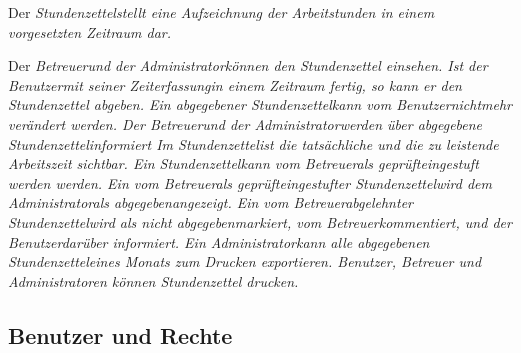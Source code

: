 \begin{requirements}
    Der \em Stundenzettel\em stellt eine Aufzeichnung der Arbeitstunden in einem vorgesetzten Zeitraum dar.
    \begin{requirements}
         Der \em Betreuer\em und der \em Administrator\em können den Stundenzettel einsehen.
         Ist der \em Benutzer\em mit seiner \em Zeiterfassung\em in einem Zeitraum fertig, so kann er den \em Stundenzettel abgeben\em.
         Ein \em abgegebener Stundenzettel\em kann vom \em Benutzer\em nichtmehr verändert werden.
         Der \em Betreuer\em und der \em Administrator\em werden über \em abgegebene Stundenzettel\em informiert
         Im \em Stundenzettel\em ist die tatsächliche und die zu leistende Arbeitszeit sichtbar.
         Ein \em Stundenzettel\em kann vom \em Betreuer\em als \em geprüft\em eingestuft werden werden.
         Ein vom \em Betreuer\em als \em geprüft\em eingestufter \em Stundenzettel\em wird dem \em Administrator\em als \em abgegeben\em angezeigt.
         Ein vom \em Betreuer\em abgelehnter \em Stundenzettel\em wird als \em nicht abgegeben\em markiert, vom \em Betreuer\em kommentiert, und der \em Benutzer\em darüber informiert.
         Ein \em Administrator\em kann alle \em abgegebenen Stundenzettel\em eines Monats zum Drucken exportieren.
        \em Benutzer\em, \em Betreuer \em und \em Administratoren \em können \em Stundenzettel \em drucken.
    \end{requirements}

\end{requirements}

\subsection{Benutzer und Rechte}

